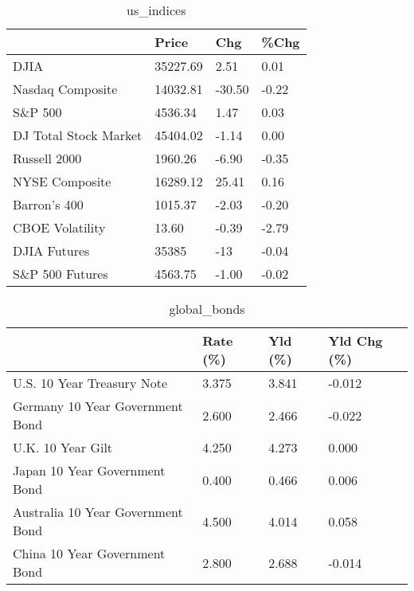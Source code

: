 \documentclass{article}%
\begin{document}
%


\begin{table}[htbp]%
\caption{us\_indices}%
\centering%
\begin{adjustbox}{width=1\textwidth}%
\begin{tabular}{llll}
\toprule
                      &    Price &    Chg &  \%Chg \\
\midrule
                 DJIA & 35227.69 &   2.51 &  0.01 \\
     Nasdaq Composite & 14032.81 & -30.50 & -0.22 \\
              S\&P 500 &  4536.34 &   1.47 &  0.03 \\
DJ Total Stock Market & 45404.02 &  -1.14 &  0.00 \\
         Russell 2000 &  1960.26 &  -6.90 & -0.35 \\
       NYSE Composite & 16289.12 &  25.41 &  0.16 \\
         Barron's 400 &  1015.37 &  -2.03 & -0.20 \\
      CBOE Volatility &    13.60 &  -0.39 & -2.79 \\
         DJIA Futures &    35385 &    -13 & -0.04 \\
      S\&P 500 Futures &  4563.75 &  -1.00 & -0.02 \\
\bottomrule
\end{tabular}
%
\end{adjustbox}%
\end{table}

%


\begin{table}[htbp]%
\caption{global\_bonds}%
\centering%
\begin{adjustbox}{width=1\textwidth}%
\begin{tabular}{llll}
\toprule
                                  & Rate (\%) & Yld (\%) & Yld Chg (\%) \\
\midrule
       U.S. 10 Year Treasury Note &    3.375 &   3.841 &      -0.012 \\
  Germany 10 Year Government Bond &    2.600 &   2.466 &      -0.022 \\
                U.K. 10 Year Gilt &    4.250 &   4.273 &       0.000 \\
    Japan 10 Year Government Bond &    0.400 &   0.466 &       0.006 \\
Australia 10 Year Government Bond &    4.500 &   4.014 &       0.058 \\
    China 10 Year Government Bond &    2.800 &   2.688 &      -0.014 \\
\bottomrule
\end{tabular}
%
\end{adjustbox}%
\end{table}
\end{document}
